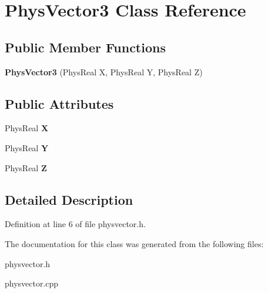 \hypertarget{classPhysVector3}{
\section{PhysVector3 Class Reference}
\label{da/d11/classPhysVector3}
}
\subsection*{Public Member Functions}
\begin{DoxyCompactItemize}
\item 
\hypertarget{classPhysVector3_aad8161121a45b20dde0e3cc6959801be}{
{\bfseries PhysVector3} (PhysReal X, PhysReal Y, PhysReal Z)}
\label{da/d11/classPhysVector3_aad8161121a45b20dde0e3cc6959801be}

\end{DoxyCompactItemize}
\subsection*{Public Attributes}
\begin{DoxyCompactItemize}
\item 
\hypertarget{classPhysVector3_ac4586254a6116c616046bd9d5b35ca31}{
PhysReal {\bfseries X}}
\label{da/d11/classPhysVector3_ac4586254a6116c616046bd9d5b35ca31}

\item 
\hypertarget{classPhysVector3_a9bf4609392a492c2b3e278d635ed976a}{
PhysReal {\bfseries Y}}
\label{da/d11/classPhysVector3_a9bf4609392a492c2b3e278d635ed976a}

\item 
\hypertarget{classPhysVector3_a0c0585976cb4c215626e205a2c663226}{
PhysReal {\bfseries Z}}
\label{da/d11/classPhysVector3_a0c0585976cb4c215626e205a2c663226}

\end{DoxyCompactItemize}


\subsection{Detailed Description}


Definition at line 6 of file physvector.h.

The documentation for this class was generated from the following files:\begin{DoxyCompactItemize}
\item 
physvector.h\item 
physvector.cpp\end{DoxyCompactItemize}
